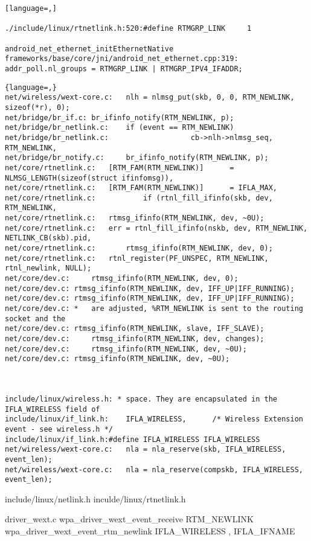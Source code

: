 \documentclass[a4paper,11pt,]{article}%
\begin{document}
\begin{lstlisting}[language=,]

./include/linux/rtnetlink.h:520:#define RTMGRP_LINK		1

android_net_ethernet_initEthernetNative
frameworks/base/core/jni/android_net_ethernet.cpp:319:        addr_poll.nl_groups = RTMGRP_LINK | RTMGRP_IPV4_IFADDR;

\end{lstlisting}

\begin{lstlisting}{language=,}
net/wireless/wext-core.c:	nlh = nlmsg_put(skb, 0, 0, RTM_NEWLINK, sizeof(*r), 0);
net/bridge/br_if.c:	br_ifinfo_notify(RTM_NEWLINK, p);
net/bridge/br_netlink.c:	if (event == RTM_NEWLINK)
net/bridge/br_netlink.c:				   cb->nlh->nlmsg_seq, RTM_NEWLINK,
net/bridge/br_notify.c:		br_ifinfo_notify(RTM_NEWLINK, p);
net/core/rtnetlink.c:	[RTM_FAM(RTM_NEWLINK)]      = NLMSG_LENGTH(sizeof(struct ifinfomsg)),
net/core/rtnetlink.c:	[RTM_FAM(RTM_NEWLINK)]      = IFLA_MAX,
net/core/rtnetlink.c:			if (rtnl_fill_ifinfo(skb, dev, RTM_NEWLINK,
net/core/rtnetlink.c:	rtmsg_ifinfo(RTM_NEWLINK, dev, ~0U);
net/core/rtnetlink.c:	err = rtnl_fill_ifinfo(nskb, dev, RTM_NEWLINK, NETLINK_CB(skb).pid,
net/core/rtnetlink.c:		rtmsg_ifinfo(RTM_NEWLINK, dev, 0);
net/core/rtnetlink.c:	rtnl_register(PF_UNSPEC, RTM_NEWLINK, rtnl_newlink, NULL);
net/core/dev.c:		rtmsg_ifinfo(RTM_NEWLINK, dev, 0);
net/core/dev.c:	rtmsg_ifinfo(RTM_NEWLINK, dev, IFF_UP|IFF_RUNNING);
net/core/dev.c:	rtmsg_ifinfo(RTM_NEWLINK, dev, IFF_UP|IFF_RUNNING);
net/core/dev.c: *	are adjusted, %RTM_NEWLINK is sent to the routing socket and the
net/core/dev.c:	rtmsg_ifinfo(RTM_NEWLINK, slave, IFF_SLAVE);
net/core/dev.c:		rtmsg_ifinfo(RTM_NEWLINK, dev, changes);
net/core/dev.c:		rtmsg_ifinfo(RTM_NEWLINK, dev, ~0U);
net/core/dev.c:	rtmsg_ifinfo(RTM_NEWLINK, dev, ~0U);



include/linux/wireless.h: * space. They are encapsulated in the IFLA_WIRELESS field of
include/linux/if_link.h:	IFLA_WIRELESS,		/* Wireless Extension event - see wireless.h */
include/linux/if_link.h:#define IFLA_WIRELESS IFLA_WIRELESS
net/wireless/wext-core.c:	nla = nla_reserve(skb, IFLA_WIRELESS, event_len);
net/wireless/wext-core.c:	nla = nla_reserve(compskb, IFLA_WIRELESS, event_len);
\end{lstlisting}

include/linux/netlink.h
inculde/linux/rtnetlink.h

driver_wext.c
wpa_driver_wext_event_receive   RTM_NEWLINK
wpa_driver_wext_event_rtm_newlink IFLA_WIRELESS , IFLA_IFNAME
\end{document}
